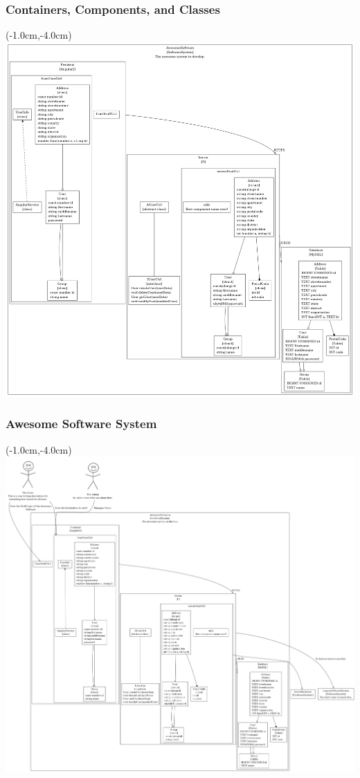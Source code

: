 \documentclass[xelatex,10pt]{beamer}
\begin{document}
\begin{frame}
	\frametitle{Containers, Components, and Classes}
	\begin{textblock*}{0cm}(-1.0cm,-4.0cm)
		\centering
		\includegraphics[width=1.0\paperwidth]{AwesomeSoftware_only.png}
	\end{textblock*}
\end{frame}

\begin{frame}
	\frametitle{Awesome Software System}
	\begin{textblock*}{0cm}(-1.0cm,-4.0cm)
		\includegraphics[width=1.0\paperwidth]{all.png}
	\end{textblock*}
\end{frame}
\end{document}
